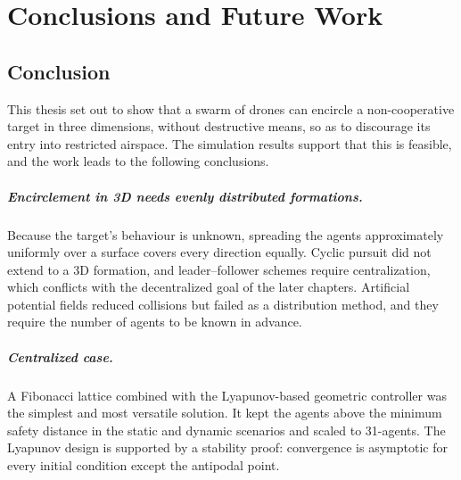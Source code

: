 
%

\chapter{Conclusions and Future Work}
\label{cha:Conclusions and Future Work}

\glsresetall

\section{Conclusion}
This thesis set out to show that a swarm of drones can encircle a non-cooperative target in three dimensions, without destructive means, so as to discourage its entry into restricted airspace. The simulation results support that this is feasible, and the work leads to the following conclusions.

\paragraph{Encirclement in 3D needs evenly distributed formations.} 
Because the target's behaviour is unknown, spreading the agents approximately uniformly over a surface covers every direction equally. Cyclic pursuit did not extend to a 3D formation, and leader--follower schemes require centralization, which conflicts with the decentralized goal of the later chapters. Artificial potential fields reduced collisions but failed as a distribution method, and they require the number of agents to be known in advance.

\paragraph{Centralized case.} 
A Fibonacci lattice combined with the Lyapunov-based geometric controller was the simplest and most versatile solution. It kept the agents above the minimum safety distance in the static and dynamic scenarios and scaled to 31-agents. The Lyapunov design is supported by a stability proof: convergence is asymptotic for every initial condition except the antipodal point.

